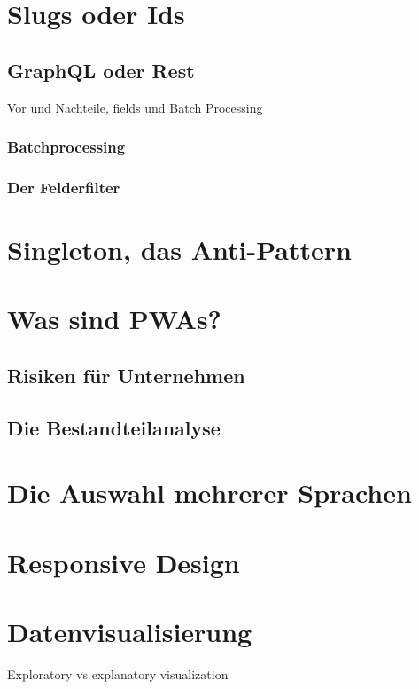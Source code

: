 \section{Slugs oder Ids}

\subsection{GraphQL oder Rest}
Vor und Nachteile, fields und Batch Processing

\subsubsection{Batchprocessing}

\subsubsection{Der Felderfilter}

\section{Singleton, das Anti-Pattern}
\section{Was sind PWAs?}

\subsection{Risiken für Unternehmen}

\subsection{Die Bestandteilanalyse}

\section{Die Auswahl mehrerer Sprachen}

\section{Responsive Design}

\section{Datenvisualisierung}
Exploratory vs explanatory visualization

